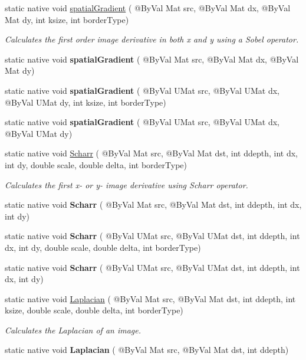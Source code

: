 \begin{DoxyCompactItemize}
static native void \hyperlink{group__imgproc__filter_ga9263e9262b1d9a29e4dc3180d4ee2683}{spatial\+Gradient} ( @By\+Val Mat src, @By\+Val Mat dx, @By\+Val Mat dy, int ksize, int border\+Type)
\begin{DoxyCompactList}\small\item\em Calculates the first order image derivative in both x and y using a Sobel operator. \end{DoxyCompactList}\item 
static native void {\bfseries spatial\+Gradient} ( @By\+Val Mat src, @By\+Val Mat dx, @By\+Val Mat dy)
\item 
static native void {\bfseries spatial\+Gradient} ( @By\+Val U\+Mat src, @By\+Val U\+Mat dx, @By\+Val U\+Mat dy, int ksize, int border\+Type)
\item 
static native void {\bfseries spatial\+Gradient} ( @By\+Val U\+Mat src, @By\+Val U\+Mat dx, @By\+Val U\+Mat dy)
\item 
static native void \hyperlink{group__imgproc__filter_gabd4c276a8055604be5e13e061eee74a1}{Scharr} ( @By\+Val Mat src, @By\+Val Mat dst, int ddepth, int dx, int dy, double scale, double delta, int border\+Type)
\begin{DoxyCompactList}\small\item\em Calculates the first x-\/ or y-\/ image derivative using Scharr operator. \end{DoxyCompactList}\item 
static native void {\bfseries Scharr} ( @By\+Val Mat src, @By\+Val Mat dst, int ddepth, int dx, int dy)
\item 
static native void {\bfseries Scharr} ( @By\+Val U\+Mat src, @By\+Val U\+Mat dst, int ddepth, int dx, int dy, double scale, double delta, int border\+Type)
\item 
static native void {\bfseries Scharr} ( @By\+Val U\+Mat src, @By\+Val U\+Mat dst, int ddepth, int dx, int dy)
\item 
static native void \hyperlink{group__imgproc__filter_ga223106fa434e6e5dee1974eab81bbf26}{Laplacian} ( @By\+Val Mat src, @By\+Val Mat dst, int ddepth, int ksize, double scale, double delta, int border\+Type)
\begin{DoxyCompactList}\small\item\em Calculates the Laplacian of an image. \end{DoxyCompactList}\item 
static native void {\bfseries Laplacian} ( @By\+Val Mat src, @By\+Val Mat dst, int ddepth)
\item 

\end{DoxyCompactItemize}
